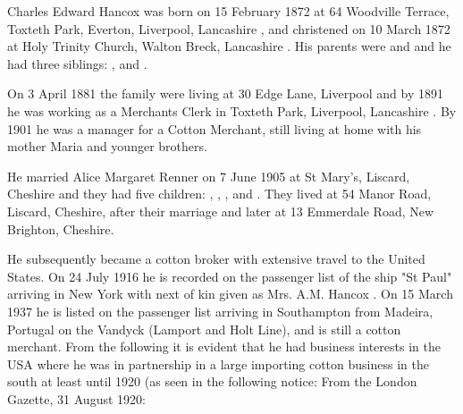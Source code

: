 
Charles Edward Hancox was born on 15 February 1872 at 64 Woodville Terrace, Toxteth Park, Everton, Liverpool, Lancashire \cite{CEHancoxBirth},  and christened on 10 March 1872 at Holy Trinity Church, Walton Breck, Lancashire \cite{CEHancoxBaptism}. His parents were  and  and he had three siblings: ,  and .


On 3 April 1881 the family were living at 30 Edge Lane, Liverpool \cite{CEHancoxResidence} and by 1891 he was working as a Merchants Clerk in Toxteth Park, Liverpool, Lancashire \cite{CEHancoxOccupation1}.
By 1901 he was a manager for a Cotton Merchant, still living at home with his mother Maria and younger brothers. 

He married Alice Margaret Renner on 7 June 1905 at St Mary's, Liscard, Cheshire \cite{CEHancoxMarriage} and they had five children: , , ,  and .
They lived at 54 Manor Road, Liscard, Cheshire, after their marriage\cite{CharlesEdwardHancoxHouse} and later at 13 Emmerdale Road, New Brighton, Cheshire. 

He subsequently became a cotton broker with extensive travel to the United States.  On 24 July 1916 he is recorded on the passenger list of the ship "St Paul" arriving in New York with next of kin given as Mrs. A.M. Hancox \cite{CEHancoxTravel}. On 15 March 1937 he is listed on the passenger list arriving in Southampton from Madeira, Portugal on the Vandyck (Lamport and Holt Line), and is still a cotton merchant. From the following it is evident that he had business interests in the USA where he was in partnership in a large importing cotton business in the south \cite{CEHancoxOccupation2} at least until 1920 (as seen in the following notice:
From the London Gazette, 31 August 1920:

